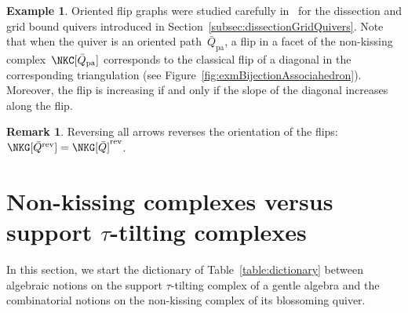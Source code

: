\documentclass{amsart}
\theoremstyle{definition}
\newtheorem{example}[theorem]{Example}
\newtheorem{remark}[theorem]{Remark}
\newcommand{\ssm}{\smallsetminus} %
\newcommand{\eqdef}{\mbox{\,\raisebox{0.2ex}{\scriptsize\ensuremath{\mathrm:}}\ensuremath{=}\,}} %
\newcommand{\fref}[1]{Figure~\ref{#1}} %
\newcommand{\pa}{_{\textrm{pa}}} %
\newcommand{\vincent}[1]{\todo[color=blue!30]{#1 \\ \hfill --- V.}}
\newcommand{\blossom}{^\text{\ding{96}}} %
\newcommand{\reversed}[1]{#1^{\mathrm{rev}}} %
\begin{document}
\begin{example}
Oriented flip graphs were studied carefully in~\cite{GarverMcConville, MannevillePilaud-accordion, McConville} for the dissection and grid bound quivers introduced in Section~\ref{subsec:dissectionGridQuivers}.
Note that when the quiver is an oriented path~$\bar Q\pa$, a flip in a facet of the non-kissing complex~$\NKC[\bar Q\pa]$ corresponds to the classical flip of a diagonal in the corresponding triangulation (see \fref{fig:exmBijectionAssociahedron}).
Moreover, the flip is increasing if and only if the slope of the diagonal increases along the flip.
\end{example}

\begin{remark}
\label{rem:reverseFlipGraph}
Reversing all arrows reverses the orientation of the flips: $\NKG[\reversed{\bar Q}] = \reversed{\NKG[\bar Q]}$.
\end{remark}

%
%


\section{Non-kissing complexes versus support $\tau$-tilting complexes}
\label{sec:nkcvsttc}

In this section, we start the dictionary of Table~\ref{table:dictionary} between algebraic notions on the support $\tau$-tilting complex of a gentle algebra and the combinatorial notions on the non-kissing complex of its blossoming quiver.
\end{document}
